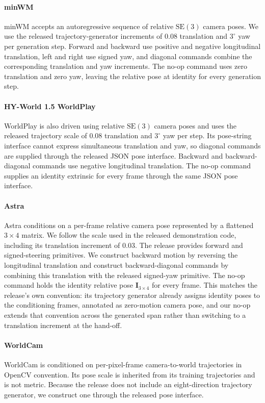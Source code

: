 \paragraph{minWM}
minWM accepts an autoregressive sequence of relative $\mathrm{SE}(3)$ camera
poses. We use the released trajectory-generator increments of $0.08$
translation and $3^\circ$ yaw per generation step. Forward and backward use
positive and negative longitudinal translation, left and right use signed
yaw, and diagonal commands combine the corresponding translation and yaw
increments. The no-op command uses zero translation and zero yaw, leaving the relative
pose at identity for every generation step.

\paragraph{HY-World 1.5 WorldPlay}
WorldPlay is also driven using relative $\mathrm{SE}(3)$ camera poses and uses
the released trajectory scale of $0.08$ translation and $3^\circ$ yaw per
step. Its pose-string interface cannot express simultaneous translation and
yaw, so diagonal commands are supplied through the released JSON pose
interface. Backward and backward-diagonal commands use negative longitudinal
translation. The no-op command supplies an identity extrinsic for every frame through the
same JSON pose interface.

\paragraph{Astra}
Astra conditions on a per-frame relative camera pose represented by a
flattened $3\times4$ matrix. We follow the scale used in the released
demonstration code, including its translation increment of $0.03$. The release
provides forward and signed-steering primitives. We construct backward motion
by reversing the longitudinal translation and construct backward-diagonal
commands by combining this translation with the released signed-yaw
primitive. The no-op command holds the identity relative pose $\mathbf{I}_{3\times4}$ for
every frame. This matches the release's own convention: its trajectory
generator already assigns identity poses to the conditioning frames, annotated
as zero-motion camera pose, and our no-op extends that convention across the
generated span rather than switching to a translation increment at the
hand-off.

\paragraph{WorldCam}
WorldCam is conditioned on per-pixel-frame camera-to-world trajectories in
OpenCV convention. Its pose scale is inherited from its training trajectories
and is not metric. Because the release does not include an eight-direction
trajectory generator, we construct one through the released pose interface.

